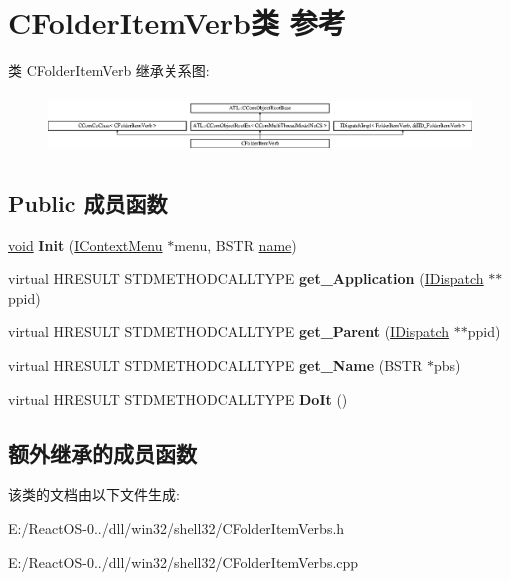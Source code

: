 \hypertarget{class_c_folder_item_verb}{}\section{C\+Folder\+Item\+Verb类 参考}
\label{class_c_folder_item_verb}
类 C\+Folder\+Item\+Verb 继承关系图\+:\begin{figure}[H]
\begin{center}
\leavevmode
\includegraphics[height=1.590909cm]{class_c_folder_item_verb}
\end{center}
\end{figure}
\subsection*{Public 成员函数}
\begin{DoxyCompactItemize}
\item 
\mbox{\label{class_c_folder_item_verb_af317bd3c7e9694d9b477229823cdf9ad}} 
\hyperlink{interfacevoid}{void} {\bfseries Init} (\hyperlink{interface_i_context_menu}{I\+Context\+Menu} $\ast$menu, B\+S\+TR \hyperlink{structname}{name})
\item 
\mbox{\label{class_c_folder_item_verb_a81b5543c319067d47140fa18147bb97a}} 
virtual H\+R\+E\+S\+U\+LT S\+T\+D\+M\+E\+T\+H\+O\+D\+C\+A\+L\+L\+T\+Y\+PE {\bfseries get\+\_\+\+Application} (\hyperlink{interface_i_dispatch}{I\+Dispatch} $\ast$$\ast$ppid)
\item 
\mbox{\label{class_c_folder_item_verb_a40d74860d3e632e8b11e77c368b5d0fb}} 
virtual H\+R\+E\+S\+U\+LT S\+T\+D\+M\+E\+T\+H\+O\+D\+C\+A\+L\+L\+T\+Y\+PE {\bfseries get\+\_\+\+Parent} (\hyperlink{interface_i_dispatch}{I\+Dispatch} $\ast$$\ast$ppid)
\item 
\mbox{\label{class_c_folder_item_verb_a09bd7e49f7b5586eac1798ce8f135e62}} 
virtual H\+R\+E\+S\+U\+LT S\+T\+D\+M\+E\+T\+H\+O\+D\+C\+A\+L\+L\+T\+Y\+PE {\bfseries get\+\_\+\+Name} (B\+S\+TR $\ast$pbs)
\item 
\mbox{\label{class_c_folder_item_verb_a4d708ea76b121dc9b66303c7525f7e41}} 
virtual H\+R\+E\+S\+U\+LT S\+T\+D\+M\+E\+T\+H\+O\+D\+C\+A\+L\+L\+T\+Y\+PE {\bfseries Do\+It} ()
\end{DoxyCompactItemize}
\subsection*{额外继承的成员函数}


该类的文档由以下文件生成\+:\begin{DoxyCompactItemize}
\item 
E\+:/\+React\+O\+S-\/0../dll/win32/shell32/C\+Folder\+Item\+Verbs.\+h\item 
E\+:/\+React\+O\+S-\/0../dll/win32/shell32/C\+Folder\+Item\+Verbs.\+cpp\end{DoxyCompactItemize}
